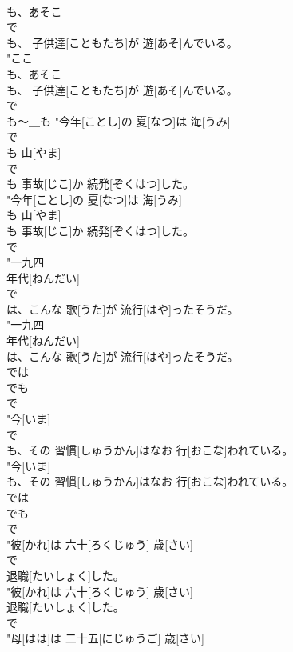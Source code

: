 \documentclass[8pt]{extreport}
\begin{document}
\begin{CJK}{UTF8}{min}
\\	も、あそこ
\\	で
\\	も、 子供達[こともたち]が 遊[あそ]んでいる。
\\	"ここ
\\	も、あそこ
\\	も、 子供達[こともたち]が 遊[あそ]んでいる。
\\	で
\\	も～＿も	"今年[ことし]の 夏[なつ]は 海[うみ]
\\	で
\\	も 山[やま]
\\	で
\\	も 事故[じこ]か 続発[ぞくはつ]した。
\\	"今年[ことし]の 夏[なつ]は 海[うみ]
\\	も 山[やま]
\\	も 事故[じこ]か 続発[ぞくはつ]した。
\\	で
\\	"一九四
\\	[せんきゅうひゃくよんじゅう] 年代[ねんだい]
\\	で
\\	は、こんな 歌[うた]が 流行[はや]ったそうだ。
\\	"一九四
\\	[せんきゅうひゃくよんじゅう] 年代[ねんだい]
\\	は、こんな 歌[うた]が 流行[はや]ったそうだ。
\\	では 
\\	でも 
\\	で
\\	"今[いま]
\\	で
\\	も、その 習慣[しゅうかん]はなお 行[おこな]われている。
\\	"今[いま]
\\	も、その 習慣[しゅうかん]はなお 行[おこな]われている。
\\	では 
\\	でも 
\\	で
\\	"彼[かれ]は 六十[ろくじゅう] 歳[さい]
\\	で
\\	退職[たいしょく]した。
\\	"彼[かれ]は 六十[ろくじゅう] 歳[さい]
\\	退職[たいしょく]した。
\\	で
\\	"母[はは]は 二十五[にじゅうご] 歳[さい]

\end{CJK}
\end{document}
